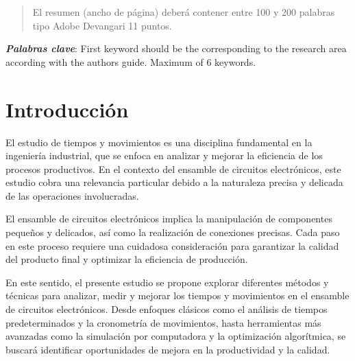 

\begin{abstract}
\noindent 
El resumen (ancho de página) deberá contener entre 100 y 200 palabras tipo Adobe Devangari 11 puntos.

\end{abstract}
% 
% 
\textbf{\textit{Palabras clave}}: {First keyword should be the corresponding to the research area according with the authors guide. Maximum of 6 keywords.}

\section{Introducción}

    El estudio de tiempos y movimientos es una disciplina fundamental en la ingeniería industrial, que se enfoca en analizar y mejorar la eficiencia de los procesos productivos. En el contexto del ensamble de circuitos electrónicos, este estudio cobra una relevancia particular debido a la naturaleza precisa y delicada de las operaciones involucradas.

    El ensamble de circuitos electrónicos implica la manipulación de componentes pequeños y delicados, así como la realización de conexiones precisas. Cada paso en este proceso requiere una cuidadosa consideración para garantizar la calidad del producto final y optimizar la eficiencia de producción.

    En este sentido, el presente estudio se propone explorar diferentes métodos y técnicas para analizar, medir y mejorar los tiempos y movimientos en el ensamble de circuitos electrónicos. Desde enfoques clásicos como el análisis de tiempos predeterminados y la cronometría de movimientos, hasta herramientas más avanzadas como la simulación por computadora y la optimización algorítmica, se buscará identificar oportunidades de mejora en la productividad y la calidad.
    
